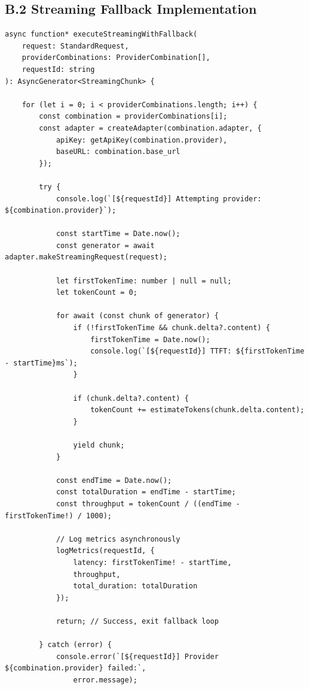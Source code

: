 \documentclass[english]{article}
\begin{document}
\subsection*{B.2 Streaming Fallback Implementation}

\begin{listing}[H]
\begin{verbatim}
async function* executeStreamingWithFallback(
    request: StandardRequest,
    providerCombinations: ProviderCombination[],
    requestId: string
): AsyncGenerator<StreamingChunk> {

    for (let i = 0; i < providerCombinations.length; i++) {
        const combination = providerCombinations[i];
        const adapter = createAdapter(combination.adapter, {
            apiKey: getApiKey(combination.provider),
            baseURL: combination.base_url
        });

        try {
            console.log(`[${requestId}] Attempting provider: ${combination.provider}`);

            const startTime = Date.now();
            const generator = await adapter.makeStreamingRequest(request);

            let firstTokenTime: number | null = null;
            let tokenCount = 0;

            for await (const chunk of generator) {
                if (!firstTokenTime && chunk.delta?.content) {
                    firstTokenTime = Date.now();
                    console.log(`[${requestId}] TTFT: ${firstTokenTime - startTime}ms`);
                }

                if (chunk.delta?.content) {
                    tokenCount += estimateTokens(chunk.delta.content);
                }

                yield chunk;
            }

            const endTime = Date.now();
            const totalDuration = endTime - startTime;
            const throughput = tokenCount / ((endTime - firstTokenTime!) / 1000);

            // Log metrics asynchronously
            logMetrics(requestId, {
                latency: firstTokenTime! - startTime,
                throughput,
                total_duration: totalDuration
            });

            return; // Success, exit fallback loop

        } catch (error) {
            console.error(`[${requestId}] Provider ${combination.provider} failed:`,
                error.message);


\end{verbatim}
\end{listing}
\end{document}
